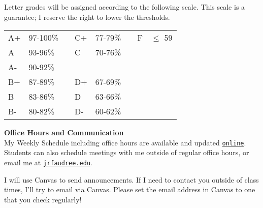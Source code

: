 \documentclass[12pt]{article}
\renewcommand{\emph}[1]{\textsf{\textbf{#1}}}
\newcommand{\localhead}[1]{\par\smallskip\textbf{#1}\nobreak\\}%
\def\heading#1{\localhead{\large\emph{#1}}}
\begin{document}
\begin{multicols}{2}
Letter grades will be assigned according to the following scale. This scale is a guarantee; I reserve the right to lower the thresholds.

\begin{tabular}{| llllllll |}
\hline
A+&97-100\%& \hspace{.1in}&C+&77-79\%& \hspace{.1in}&F&$\leq$ 59\\
A&93-96\%&&C&70-76\%&&&\\
A-&90-92\%&&&&&&\\
B+&87-89\%& \hspace{.1in}&D+&67-69\%&&&\\
B&83-86\%&&D&63-66\%&&&\\
B-&80-82\%&&D-&60-62\%&&&\\
\hline
\end{tabular} 

\end{multicols}

\heading{Office Hours and Communication}
My Weekly Schedule including office hours are available and updated \href{https://docs.google.com/spreadsheets/d/e/2PACX-1vTh65fkl5DpmD3PzPa8Kua2tzvb4Our1Nhk8DoVGuP0t3LApdM4Lne4BR9tTcgcxuE5Y5TOwwSSEtKq/pubhtml}{\texttt{online}}.  Students can also schedule meetings with me outside of regular office hours, or email me at \href{mailto:jrfaudree@alaska.edu}{\texttt{jrfaudree\@@alaska.edu}}.

I will use Canvas to send announcements.  If I need to contact you outside of class times, I'll try to email via Canvas.  Please set the email address in Canvas to one that you check regularly!


\end{document}

